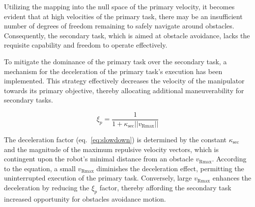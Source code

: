 \documentclass[letterpaper, 10 pt, conference]{ieeeconf}  %
\begin{document}
%
%
%

Utilizing the mapping into the null space of the primary velocity, it becomes evident that at high velocities of the primary task, there may be an insufficient number of degrees of freedom remaining to safely navigate around obstacles. Consequently, the secondary task, which is aimed at obstacle avoidance, lacks the requisite capability and freedom to operate effectively.

\label{chap:primary slowdown}

To mitigate the dominance of the primary task over the secondary task, a mechanism for the deceleration of the primary task's execution has been implemented. This strategy effectively decreases the velocity of the manipulator towards its primary objective, thereby allocating additional maneuverability for secondary tasks.

\begin{equation}
	\label{eq:slowdown}
	\xi_{p}=
	\frac{1}{1 + \kappa_{\text{sec}} ||v_{\text{Rmax}}||}
\end{equation}

The deceleration factor (eq.~\ref{eq:slowdown}) is determined by the constant \( \kappa_{\text{sec}} \) and the magnitude of the maximum repulsive velocity vectors, which is contingent upon the robot's minimal distance from an obstacle \( v_{\text{Rmax}} \). According to the equation, a small \( v_{\text{Rmax}} \) diminishes the deceleration effect, permitting the uninterrupted execution of the primary task. Conversely, large \( v_{\text{Rmax}} \) enhances the deceleration by reducing the $\xi_{p}$ factor, thereby affording the secondary task increased opportunity for obstacles avoidance motion.
\end{document}
